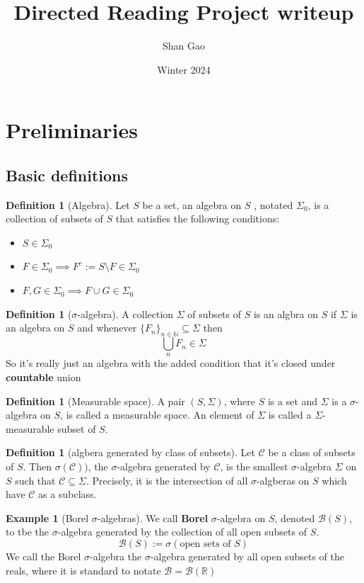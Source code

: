 \documentclass{tufte-handout}
\title{Directed Reading Project writeup}
\author{Shan Gao}
\date{Winter 2024}  %
\theoremstyle{definition}
\newtheorem{defn}[thm]{Definition}
\newtheorem{exmp}[thm]{Example}
\theoremstyle{remark}
\begin{document}
\maketitle
\section*{Preliminaries}
\subsection*{Basic definitions}
\begin{defn}[Algebra]
Let $S$ be a set, an algebra on $S$ , notated $\Sigma_0$, is a collection of subsets of $S$ that satisfies the following conditions:
\begin{itemize}
    \item $S \in \Sigma_0$
    \item $F \in \Sigma_0 \implies F^c :=  S \setminus F \in \Sigma_0$
    \item $F,G \in \Sigma_0 \implies F \cup G \in \Sigma_0$
    
\end{itemize}
\end{defn}
\begin{defn}[$\sigma$-algebra]
A collection $\Sigma$ of subsets of $S$ is an algbra on $S$ if $\Sigma$ is an algebra on $S$ and whenever $\{F_n\}_{n \in \mathbb{N}} \subseteq \Sigma$ then
$$
\bigcup_{n} F_n \in \Sigma
$$
So it's really just an algebra with the added condition that it's closed under \textbf{countable} union

    
\end{defn}
\begin{defn}[Measurable space]
    A pair $(S,\Sigma)$, where $S$ is a set and $\Sigma$ is a $\sigma$-algebra on $S$, is called a measurable space. An element of $\Sigma$ is called a $\Sigma$-measurable subset of $S$. 
\end{defn}
\begin{defn}[algbera generated by class of subsets]
    Let $\mathcal{C}$ be a class of subsets of $S$. Then $\sigma(\mathcal{C}))$, the $\sigma$-algebra generated by $\mathcal{C}$, is the smallest $\sigma$-algebra $\Sigma$ on $S$ such that $\mathcal{C} \subseteq \Sigma$. Precisely, it is the intersection of all $\sigma$-algberas on $S$ which have $\mathcal{C}$ as a subclass. 
\end{defn}
\begin{exmp}[Borel $\sigma$-algebras]
We call \textbf{Borel} $\sigma$-algebra on $S$, denoted $\mathcal{B}(S)$, to tbe the $\sigma$-algebra generated by the collection of all open subsets of $S$. 
$$
\mathcal{B}(S) := \sigma(\text{open sets of $S$} )
$$
We call the Borel $\sigma$-algebra the $\sigma$-algebra generated by all open subsets of the reals, where it is standard to notate $\mathcal{B} = \mathcal{B}(\mathbb{R})$
    
\end{exmp}
\end{document}
